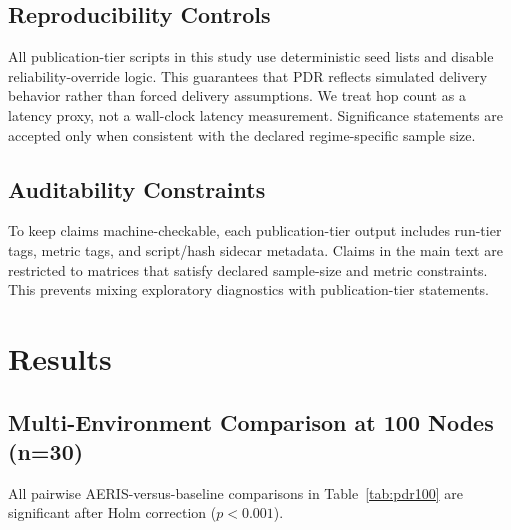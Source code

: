 ﻿\documentclass[sensors,article,submit,moreauthors,pdftex]{Definitions/mdpi}
\begin{document}
\subsection{Reproducibility Controls}
All publication-tier scripts in this study use deterministic seed lists and disable reliability-override logic. This guarantees that PDR reflects simulated delivery behavior rather than forced delivery assumptions. We treat hop count as a latency proxy, not a wall-clock latency measurement. Significance statements are accepted only when consistent with the declared regime-specific sample size.

\subsection{Auditability Constraints}
To keep claims machine-checkable, each publication-tier output includes run-tier tags, metric tags, and script/hash sidecar metadata. Claims in the main text are restricted to matrices that satisfy declared sample-size and metric constraints. This prevents mixing exploratory diagnostics with publication-tier statements.

\section{Results}
\subsection{Multi-Environment Comparison at 100 Nodes (n=30)}
\begin{table}[H]
\caption{Legacy comparability matrix (strict collision/relay flags disabled): PDR by environment at 100 nodes (n=30 per environment-protocol cell).}
\label{tab:pdr100}
\centering
{}
\end{table}
All pairwise AERIS-versus-baseline comparisons in Table~\ref{tab:pdr100} are significant after Holm correction ($p<0.001$).
\end{document}
